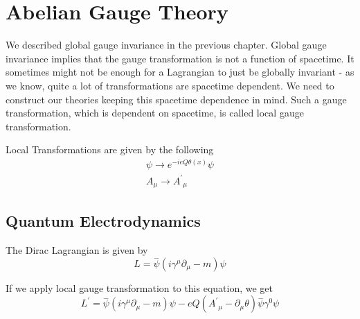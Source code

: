 
\chapter{Abelian Gauge Theory} %

\label{Chapter2} %



We described global gauge invariance in the previous chapter. Global gauge invariance implies that the gauge transformation is not a function of spacetime. It sometimes might not be enough for a Lagrangian to just be globally invariant - as we know, quite a lot of transformations are spacetime dependent. We need to construct our theories keeping this spacetime dependence in mind. Such a gauge transformation, which is dependent on spacetime, is called local gauge transformation.

Local Transformations are given by the following
\begin{subequations}
\begin{align}
\psi \xrightarrow{} e^{-ieQ{\theta}(x)}\psi\\
A_\mu \xrightarrow{} {A^'}_\mu
\end{align}
\end{subequations}\cite{lahiri04}

\section{Quantum Electrodynamics}
The Dirac Lagrangian is given by
\begin{equation}
{L} = \overset{-}{\psi}(i{\gamma^\mu}\partial_\mu-m)\psi
\end{equation}

If we apply local gauge transformation to this equation, we get\cite{lahiri04}
\begin{equation}
{L^'}= \overset{-}{\psi}(i\gamma^\mu\partial_{\mu}-m)\psi-eQ({A^'}_{\mu}-\partial_\mu\theta)\overset{-}\psi\gamma^0\psi
\end{equation}

